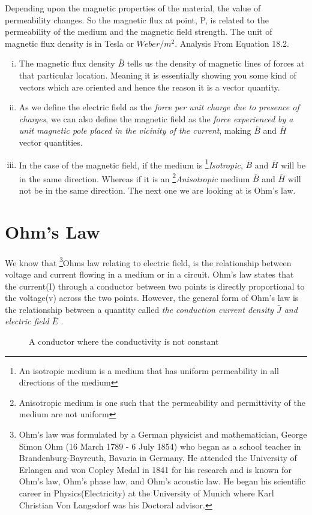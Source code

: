 Depending upon the magnetic properties of the material, the value of permeability changes. So the magnetic flux at point, P, is related to the permeability of the medium and the magnetic field strength. The unit of magnetic flux density is in Tesla or $Weber/m^{2}$. Analysis From Equation 18.2.
\begin{enumerate}[(i)]
\item The magnetic flux density $\bar{B}$ tells us the density of magnetic lines of forces at that particular location. Meaning it is essentially showing you some kind of vectors which are oriented and hence the reason it is a vector quantity.
\item As we define the electric field as the \emph{force per unit charge due to presence of charges}, we can also define the magnetic field as the \emph{force experienced by a unit magnetic pole placed in the vicinity of the current}, making $\bar{B}$ and $\bar{H}$ vector quantities.
\item In the case of the magnetic field, if the medium is \footnote[2]{An isotropic medium is a medium that has uniform permeability in all directions of the medium }\emph{Isotropic}, $\bar{B}$ and $\bar{H}$ will be in the same direction. Whereas if it is an \footnote[3]{Anisotropic medium is one such that the permeability and permittivity of the medium are not uniform }\emph{Anisotropic} medium $\bar{B}$ and $\bar{H}$ will not be in the same direction. The next one we are looking at is Ohm's law.
\end{enumerate}

\section{Ohm's Law} 
We know that \footnote{
Ohm's law was formulated by a German physicist and mathematician, George Simon Ohm (16 March 1789 - 6 July 1854) who began as a school teacher in Brandenburg-Bayreuth, Bavaria in Germany. He attended the University of Erlangen and won Copley Medal in 1841 for his research and is known for Ohm's law, Ohm's phase law, and Ohm's acoustic law. He began his scientific career in Physics(Electricity) at the University of Munich where Karl Christian Von Langsdorf was his Doctoral advisor.}Ohms law relating to electric field, is the relationship between voltage and current flowing in a medium or in a circuit. Ohm's law states that the current(I) through a conductor between two points is directly proportional to the voltage(v) across the two points. However, the general form of Ohm's law is the relationship between a quantity called \emph{the conduction current density $ \bar{J} $ and electric field $ \bar{E} $
}.
\begin{figure}
\centering
\caption{A conductor where the conductivity is not constant}
\label{}
\end{figure}


